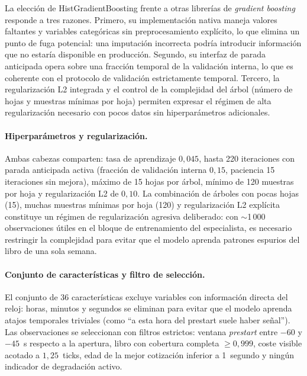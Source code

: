 \documentclass[11pt,a4paper]{article}
\begin{document}
La elección de HistGradientBoosting frente a otras librerías de \emph{gradient
boosting} responde a tres razones. Primero, su implementación nativa maneja valores
faltantes y variables categóricas sin preprocesamiento explícito, lo que elimina
un punto de fuga potencial: una imputación incorrecta podría introducir información
que no estaría disponible en producción. Segundo, su interfaz de parada anticipada
opera sobre una fracción temporal de la validación interna, lo que es coherente con
el protocolo de validación estrictamente temporal. Tercero, la regularización L2
integrada y el control de la complejidad del árbol (número de hojas y muestras
mínimas por hoja) permiten expresar el régimen de alta regularización necesario con
pocos datos sin hiperparámetros adicionales.

\paragraph{Hiperparámetros y regularización.}
Ambas cabezas comparten: tasa de aprendizaje $0{,}045$, hasta 220 iteraciones con
parada anticipada activa (fracción de validación interna $0{,}15$, paciencia 15
iteraciones sin mejora), máximo de 15 hojas por árbol, mínimo de 120 muestras por
hoja y regularización L2 de $0{,}10$. La combinación de árboles con pocas hojas
(15), muchas muestras mínimas por hoja (120) y regularización L2 explícita
constituye un régimen de regularización agresiva deliberado: con $\sim$1\,000
observaciones útiles en el bloque de entrenamiento del especialista, es necesario
restringir la complejidad para evitar que el modelo aprenda patrones espurios del
libro de una sola semana.

\paragraph{Conjunto de características y filtro de selección.}
El conjunto de 36 características excluye variables con información directa del
reloj: horas, minutos y segundos se eliminan para evitar que el modelo aprenda
atajos temporales triviales (como ``a esta hora del prestart suele haber señal'').
Las observaciones se seleccionan con filtros estrictos: ventana \emph{prestart}
entre $-60$ y $-45$~s respecto a la apertura, libro con cobertura completa
$\geq 0{,}999$, coste visible acotado a $1{,}25$~ticks, edad de la mejor
cotización inferior a 1~segundo y ningún indicador de degradación activo.
\end{document}
